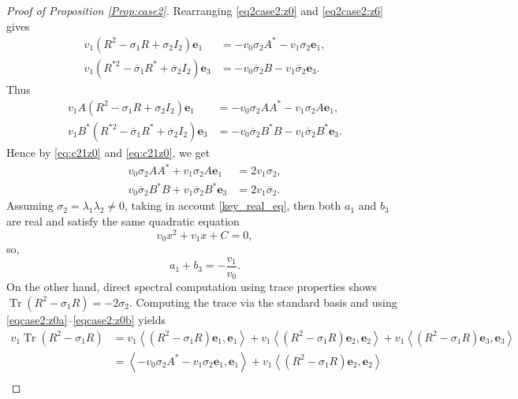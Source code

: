 \documentclass[10pt,a4paper]{amsart}
\begin{document}
\begin{proof}[Proof of Proposition \ref{Prop:case2}]
	Rearranging \eqref{eq2case2:z0} and \eqref{eq2case2:z6} gives
	\begin{align}
		v_1 \left( R^2 - \sigma_1 R + \sigma_2 I_2 \right) \mathbf{e}_1 &= -v_0 \sigma_2 A^* - v_1\sigma_2 \mathbf{e}_1, \label{eqcase2:z0a} \\
		v_1 \left( R^{*2} - \overline{\sigma}_1 R^* + \overline{\sigma}_2 I_2 \right) \mathbf{e}_3 &= -v_0 \overline{\sigma}_2 B - v_1\overline{\sigma}_2 \mathbf{e}_3. \label{eqcase2:z0b}
	\end{align}
Thus
\begin{align*}
	v_1 A \left( R^2 - \sigma_1 R + \sigma_2 I_2 \right) \mathbf{e}_1 &= -v_0 \sigma_2 AA^* - v_1\sigma_2 A\mathbf{e}_1, \\
	v_1 B^*\left( R^{*2} - \overline{\sigma}_1 R^* + \overline{\sigma}_2 I_2 \right) \mathbf{e}_3 &= -v_0 \overline{\sigma}_2 B^*B - v_1\overline{\sigma}_2 B^*\mathbf{e}_3. 
\end{align*}
Hence by \eqref{eq:c21z0} and \eqref{eq:c21z0}, we get
\begin{align*}
v_0 \sigma_2 AA^* + v_1\sigma_2 A\mathbf{e}_1 &= 2v_1\sigma_2, \\
v_0 \overline{\sigma}_2 B^*B + v_1\overline{\sigma}_2 B^*\mathbf{e}_3 &=2v_1\overline{\sigma}_2 . 
\end{align*}
	Assuming $\sigma_2 = \lambda_1\lambda_2 \neq 0$, taking in account \eqref{key_real_eq}, then both $a_1$ and $b_3$ are real and satisfy the same quadratic equation
	\begin{equation}\label{quadratic_general}
		v_0 x^2 + v_1 x + C = 0,
	\end{equation}
	so,
	\begin{equation}\label{sum_roots}
		a_1 + b_3 = -\frac{v_1}{v_0}.
	\end{equation}
	On the other hand, direct spectral computation using trace properties shows  $\operatorname{Tr}(R^2 - \sigma_1 R) = -2\sigma_2$. Computing the trace via the standard basis and using \eqref{eqcase2:z0a}--\eqref{eqcase2:z0b} yields
	\begin{align*}
		v_1 \operatorname{Tr}(R^2 - \sigma_1 R) &=v_1\left\langle (R^2 - \sigma_1 R)\mathbf{e}_1, \mathbf{e}_1 \right\rangle+v_1\left\langle (R^2 - \sigma_1 R)\mathbf{e}_2, \mathbf{e}_2 \right\rangle+v_1\left\langle (R^2 - \sigma_1 R)\mathbf{e}_3, \mathbf{e}_3 \right\rangle \\
		&= \left\langle -v_0 \sigma_2 A^* - v_1\sigma_2 \mathbf{e}_1, \mathbf{e}_1 \right\rangle + v_1\left\langle (R^2 - \sigma_1 R)\mathbf{e}_2, \mathbf{e}_2 \right\rangle \\

\end{align*}
\end{proof}
\end{document}
